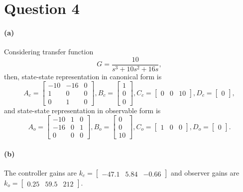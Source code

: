 \section{Question 4}
\paragraph{(a)} Considering transfer function
\begin{equation}
G = \frac{10}{s^3 + 10s^2 + 16s},
\end{equation}
\noindent then, state-state representation in canonical form is
\begin{equation*}
A_c =
\begin{bmatrix}
-10 & - 16 	& 0 \\
1   &  	0	& 0 \\
0 	&	1 	& 0 	
\end{bmatrix},
B_c =
\begin{bmatrix}
1 \\ 0 \\ 0
\end{bmatrix},
C_c = 
\begin{bmatrix}
0 	& 	0 	& 	10
\end{bmatrix},
D_c =
\begin{bmatrix}
0
\end{bmatrix},
\end{equation*}
and state-state representation in observable form is
\begin{equation*}
A_o =
\begin{bmatrix}
-10 	&   1 	& 0 \\
-16 	& 	0	& 1 \\
  0 	&	0 	& 0 	
\end{bmatrix},
B_o =
\begin{bmatrix}
0 \\ 0 \\ 10
\end{bmatrix},
C_o = 
\begin{bmatrix}
1 	& 	0 	& 	0
\end{bmatrix},
D_o =
\begin{bmatrix}
0
\end{bmatrix}.
\end{equation*}

\paragraph{(b)} The controller gains are $k_c=\begin{bmatrix}
-47.1 & 5.84 & -0.66
\end{bmatrix}$ and observer gains are $k_o = \begin{bmatrix}
0.25 & 59.5 & 212
\end{bmatrix}$.


